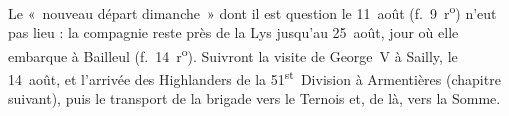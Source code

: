 Le «~nouveau départ dimanche~» dont il est question le 11~août (f.~9~r\textsuperscript{o}) n'eut pas lieu : la compagnie reste près de la Lys jusqu'au 25~août, jour où elle embarque à Bailleul (f.~14~r\textsuperscript{o}). Suivront la visite de George~V à Sailly, le 14~août, et l'arrivée des Highlanders de la 51\textsuperscript{st}~Division à Armentières (chapitre suivant), puis le transport de la brigade vers le Ternois et, de là, vers la Somme.
